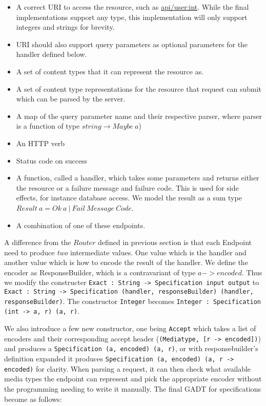 \begin{itemize}
    \item A correct URI to access the resource, such as \url{api/user:int}.
        While the final implementations support any type, this implementation
        will only support integers and strings for brevity.
    \item URI should also support query parameters as optional parameters for
        the handler defined below.
    \item A set of content types that it can represent the resource as.
    \item A set of content type representations for the resource that request can
        submit which can be parsed by the server.
    \item A map of the query parameter name and their respective parser,
        where parser is a function of type $string \rightarrow Maybe\ a$)
    \item An HTTP verb
    \item Status code on success
    \item A function, called a handler, which takes some parameters and returns
        either the resource or a failure message and failure code. This is used
        for side effects, for instance database access. We model the result as
        a sum type $Result\ a = Ok\ a\ |\ Fail\ Message\ Code$.
    \item A combination of one of these endpoints.
\end{itemize}

A difference from the $Router$ defined in previous section is that each Endpoint
need to produce \textit{two} intermediate values. One value which is the handler
and another value which is how to encode the result of the handler. We define
the encoder as ResponseBuilder, which is a contravariant of type $a -> encoded$.
Thus we modify the constructer \texttt{Exact : String -> Specification input
output} to \texttt{Exact : String -> Specification (handler, responseBuilder)
(handler, responseBuilder)}. The constructor \texttt{Integer} becomes
\texttt{Integer : Specification (int -> a, r) (a, r)}.

We also introduce a few new constructor, one being \texttt{Accept} which takes a
list of encoders and their corresponding accept header (\texttt{(Mediatype, [r
-> encoded])}) and produces a \texttt{Specification (a, encoded) (a, r)}, or
with responsebuilder's definition expanded it produces \texttt{Specification
(a, encoded) (a, r -> encoded)} for clarity. When parsing a request, it can
then check what available media types the endpoint can represent and pick
the appropriate encoder without the programming needing to write it
manually. The final GADT for specifications become as follows:

